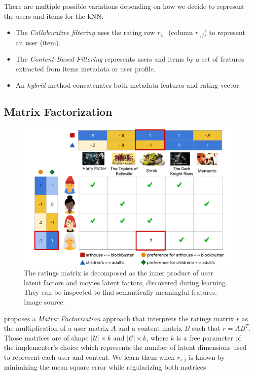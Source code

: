 There are multiple possible variations depending on how we decide to represent the users and items for the kNN:

\begin{itemize}
    \item The \emph{Collaborative filtering} uses the rating row $r_{i,\cdot}$ (column $r_{\cdot, j}$) to represent an user (item).
    \item The \emph{Content-Based Filtering} represents users and items by a set of features extracted from items metadata or user profile.
    \item An \emph{hybrid} method concatenates both metadata features and rating vector.
\end{itemize}

\subsection{Matrix Factorization}

\begin{figure}
    \centering
    \includegraphics[scale=0.5]{70-files/matrix-factorization.pdf}
    \caption{The ratings matrix is decomposed as the inner product of user latent factors and movies latent factors, discovered during learning. They can be inspected to find semantically meaningful features. Image source: }
    \label{fig:matrixfactorization}
\end{figure}

\citet{funkmf} proposes a \emph{Matrix Factorization} approach that interprets the ratings matrix $r$ as the multiplication of a user matrix $A$ and a content matrix $B$ such that $r=AB^T$. Those matrices are of shape $|\mathcal{U}|\times k$ and $|\mathcal{C}| \times k$, where $k$ is a free parameter of the implementer's choice which represents the number of latent dimensions used to represent each user and content. We learn them when $r_{i,j}$ is known by minimizing the mean square error while regularizing both matrices

